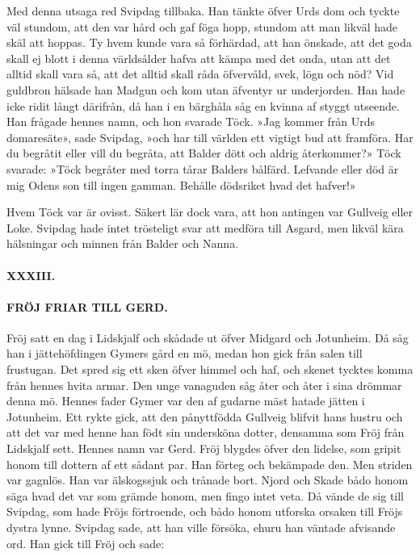 \protect\hypertarget{lb1625905.xhtmlux5cux23start131}{}{}\protect\hypertarget{lb1625905.xhtmlux5cux23start131-a}{}{}\protect\hypertarget{lb1625905.xhtmlux5cux23start131-b}{}{}\protect\hypertarget{lb1625905.xhtmlux5cux23start131-c}{}{}\protect\hypertarget{lb1625905.xhtmlux5cux23start131-d}{}{}

Med denna utsaga red Svipdag tillbaka. Han tänkte öfver Urds dom och
tyckte väl stundom, att den var hård och gaf föga hopp, stundom att man
likväl hade skäl att hoppas. Ty hvem kunde vara så förhärdad, att han
önskade, att det goda skall ej blott i denna världsålder hafva att kämpa
med det onda, utan att det alltid skall vara så, att det alltid skall
råda öfvervåld, svek, lögn och nöd? Vid guldbron hälsade han Madgun och
kom utan äfventyr ur underjorden. Han hade icke ridit långt därifrån, då
han i en bärghåla såg en kvinna af styggt utseende. Han frågade hennes
namn, och hon svarade Töck. »Jag kommer från Urds domaresäte», sade
Svipdag, »och har till världen ett vigtigt bud att framföra. Har du
begråtit eller vill du begråta, att Balder dött och aldrig återkommer?»
Töck svarade: »Töck begråter med torra tårar Balders bålfärd. Lefvande
eller död är mig Odens son till ingen gamman. Behålle dödsriket hvad det
hafver!»

Hvem Töck var är ovisst. Säkert lär dock vara, att hon antingen var
Gullveig eller Loke. Svipdag hade intet trösteligt svar att medföra till
Asgard, men likväl kära hälsningar och minnen från Balder och Nanna.

\paragraph{XXXIII.}

\paragraph{FRÖJ FRIAR TILL GERD.}

Fröj satt en dag i Lidskjalf och skådade ut öfver Midgard och Jotunheim.
Då såg han i jättehöfdingen Gymers gård en mö, medan hon gick från salen
till frustugan. Det spred sig ett sken öfver himmel och haf, och skenet
tycktes komma från hennes hvita armar. Den unge vanaguden såg åter och
åter i sina drömmar denna mö. Hennes fader Gymer var den af gudarne mäst
hatade jätten i Jotunheim. Ett rykte gick, att den pånyttfödda Gullveig
blifvit hans hustru och att det var med henne han födt sin undersköna
dotter, densamma som Fröj från Lidskjalf sett. Hennes namn var Gerd.
Fröj
\protect\hypertarget{lb1625905.xhtmlux5cux23start132}{}{}\protect\hypertarget{lb1625905.xhtmlux5cux23start132-a}{}{}\protect\hypertarget{lb1625905.xhtmlux5cux23start132-b}{}{}\protect\hypertarget{lb1625905.xhtmlux5cux23start132-c}{}{}\protect\hypertarget{lb1625905.xhtmlux5cux23start132-d}{}{}
blygdes öfver den lidelse, som gripit honom till dottern af ett sådant
par. Han förteg och bekämpade den. Men striden var gagnlös. Han var
älskogssjuk och trånade bort. Njord och Skade bådo honom säga hvad det
var som grämde honom, men fingo intet veta. Då vände de sig till
Svipdag, som hade Fröjs förtroende, och bådo honom utforska orsaken till
Fröjs dystra lynne. Svipdag sade, att han ville försöka, ehuru han
väntade afvisande ord. Han gick till Fröj och sade:

